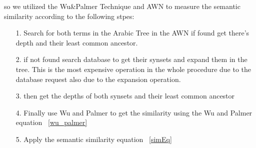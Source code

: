 so we utilized the Wu\&Palmer Technique and AWN to measure the semantic similarity according to the following stpes:
\begin{itemize}
\item [1.] Search for both terms in the Arabic Tree in the AWN if found get there’s  depth and their least common ancestor.
\item [2.] if not found search database to get their synsets and expand them in the tree. This is the most expensive operation in the whole procedure due to the database request also due to the expansion operation.
\item [3.] then get the depths of both synsets and their least common ancestor 
\item [4.] Finally use Wu and Palmer to get the similarity using the Wu and Palmer equation ~\ref{wu_palmer}
\item [5.] Apply the semantic similarity equation ~\ref{simEq}
\end{itemize}

